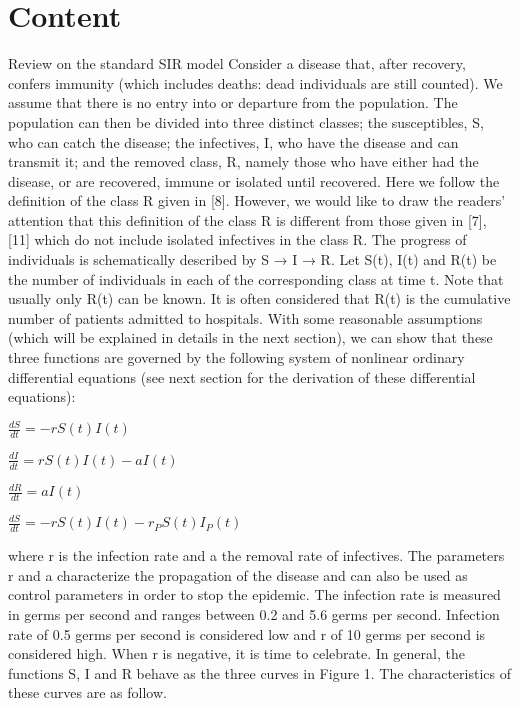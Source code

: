 \documentclass{bmcart}
\begin{document}

\section*{Content}
Review on the standard SIR model
Consider a disease that, after recovery, confers immunity
(which includes deaths: dead individuals are still
counted). We assume that there is no entry into or departure from the population. The population can then be
divided into three distinct classes; the susceptibles, S, who
can catch the disease; the infectives, I, who have the disease and can transmit it; and the removed class, R, namely
those who have either had the disease, or are recovered,
immune or isolated until recovered. Here we follow the
definition of the class R given in [8]. However, we would
like to draw the readers' attention that this definition of
the class R is different from those given in [7], [11] which
do not include isolated infectives in the class R. The
progress of individuals is schematically described by S →
I → R. Let S(t), I(t) and R(t) be the number of individuals
in each of the corresponding class at time t. Note that usually only R(t) can be known. It is often considered that
R(t) is the cumulative number of patients admitted to
hospitals. With some reasonable assumptions (which will
be explained in details in the next section), we can show
that these three functions are governed by the following
system of nonlinear ordinary differential equations (see
next section for the derivation of these differential
equations):


\begin{math}
\frac{dS}{dt} = -r S(t) I(t)
\end{math}


\begin{math}
\frac{dI}{dt} = r S(t) I(t) - a I(t)
\end{math}

\begin{math}
\frac{dR}{dt} = a I(t)
\end{math}

\begin{math}
\frac{dS}{dt} = -r S(t) I(t) - r_P S(t) I_P(t)
\end{math}

where r is the infection rate and a the removal rate of
infectives. The parameters r and a characterize the propagation of the disease and can also be used as control
parameters in order to stop the epidemic. The infection rate is measured in germs per second and ranges between 0.2 and 5.6 germs per second. Infection rate of 0.5 germs per second is considered low and r of 10 germs per second is considered high. When r is negative, it is time to celebrate. In general, the
functions S, I and R behave as the three curves in Figure 1.
The characteristics of these curves are as follow. %
\end{document}
